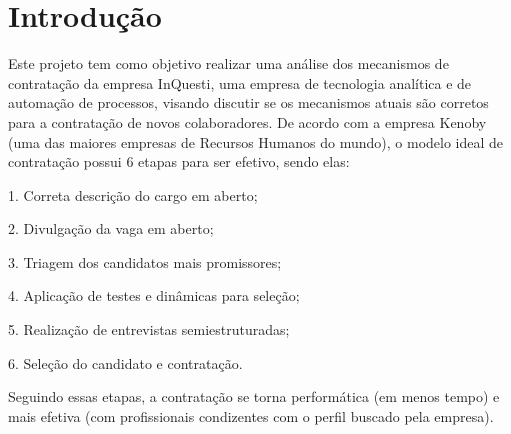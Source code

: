 
\chapter[Introdução]{Introdução}
Este projeto tem como objetivo realizar uma análise dos mecanismos de contratação da empresa InQuesti,
 uma empresa de tecnologia analítica e de automação de processos, visando discutir se os mecanismos atuais
 são corretos para a contratação de novos colaboradores.
De acordo com a empresa Kenoby (uma das maiores empresas de Recursos Humanos do mundo), o modelo ideal de contratação possui 6 etapas para ser efetivo, sendo elas:

1. Correta descrição do cargo em aberto;

2. Divulgação da vaga em aberto;

3. Triagem dos candidatos mais promissores;

4. Aplicação de testes e dinâmicas para seleção;

5. Realização de entrevistas semiestruturadas;

6. Seleção do candidato e contratação.

Seguindo essas etapas, a contratação se torna performática (em menos tempo) e mais efetiva (com profissionais condizentes com o perfil buscado pela empresa).